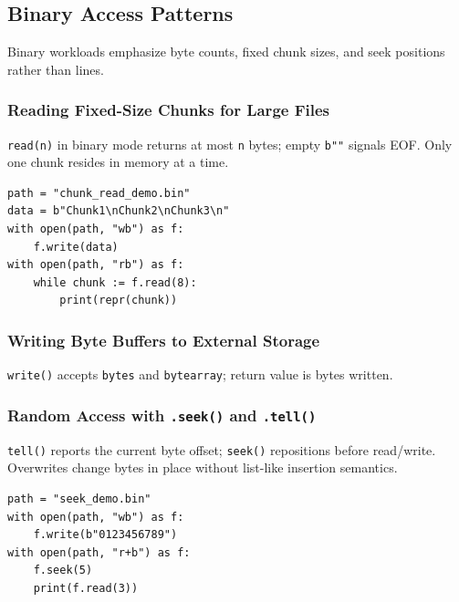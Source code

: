 \subsection{Binary Access Patterns}

Binary workloads emphasize byte counts, fixed chunk sizes, and seek positions rather than lines.

\subsubsection{Reading Fixed-Size Chunks for Large Files}

\texttt{read(n)} in binary mode returns at most \texttt{n} bytes; empty \texttt{b""} signals EOF. Only one chunk resides in memory at a time.

\begin{verbatim}
path = "chunk_read_demo.bin"
data = b"Chunk1\nChunk2\nChunk3\n"
with open(path, "wb") as f:
    f.write(data)
with open(path, "rb") as f:
    while chunk := f.read(8):
        print(repr(chunk))
\end{verbatim}

\subsubsection{Writing Byte Buffers to External Storage}

\texttt{write()} accepts \texttt{bytes} and \texttt{bytearray}; return value is bytes written.

\subsubsection{Random Access with \texttt{.seek()} and \texttt{.tell()}}

\texttt{tell()} reports the current byte offset; \texttt{seek()} repositions before read/write. Overwrites change bytes in place without list-like insertion semantics.

\begin{verbatim}
path = "seek_demo.bin"
with open(path, "wb") as f:
    f.write(b"0123456789")
with open(path, "r+b") as f:
    f.seek(5)
    print(f.read(3))
\end{verbatim}
